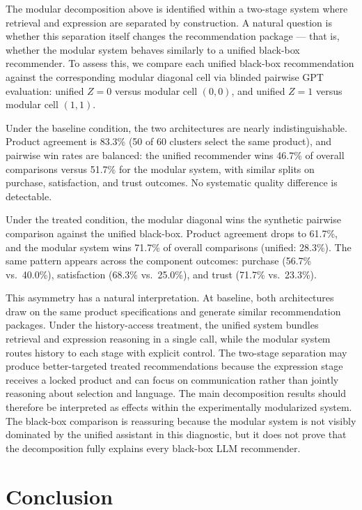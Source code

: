 \documentclass[11pt]{article}
\begin{document}
The modular decomposition above is identified within a two-stage system where retrieval and expression are separated by construction. A natural question is whether this separation itself changes the recommendation package --- that is, whether the modular system behaves similarly to a unified black-box recommender. To assess this, we compare each unified black-box recommendation against the corresponding modular diagonal cell via blinded pairwise GPT evaluation: unified $Z=0$ versus modular cell $(0,0)$, and unified $Z=1$ versus modular cell $(1,1)$.

Under the baseline condition, the two architectures are nearly indistinguishable. Product agreement is 83.3\% (50 of 60 clusters select the same product), and pairwise win rates are balanced: the unified recommender wins 46.7\% of overall comparisons versus 51.7\% for the modular system, with similar splits on purchase, satisfaction, and trust outcomes. No systematic quality difference is detectable.

Under the treated condition, the modular diagonal wins the synthetic pairwise comparison against the unified black-box. Product agreement drops to 61.7\%, and the modular system wins 71.7\% of overall comparisons (unified: 28.3\%). The same pattern appears across the component outcomes: purchase (56.7\% vs.\ 40.0\%), satisfaction (68.3\% vs.\ 25.0\%), and trust (71.7\% vs.\ 23.3\%).

This asymmetry has a natural interpretation. At baseline, both architectures draw on the same product specifications and generate similar recommendation packages. Under the history-access treatment, the unified system bundles retrieval and expression reasoning in a single call, while the modular system routes history to each stage with explicit control. The two-stage separation may produce better-targeted treated recommendations because the expression stage receives a locked product and can focus on communication rather than jointly reasoning about selection and language. The main decomposition results should therefore be interpreted as effects within the experimentally modularized system. The black-box comparison is reassuring because the modular system is not visibly dominated by the unified assistant in this diagnostic, but it does not prove that the decomposition fully explains every black-box LLM recommender.

\section{Conclusion}\label{section:conclusion}
\end{document}
